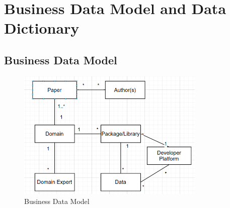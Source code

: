 \documentclass[12pt]{article}
\begin{document}
\section{Business Data Model and Data Dictionary}
\subsection{Business Data Model}
\begin{figure}[h!]
  \centering
  \includegraphics[width=0.8\textwidth]{images/BusinessDataModel.png}
  \caption{Business Data Model}
  \label{fig:business-data-model}
\end{figure}
\end{document}
